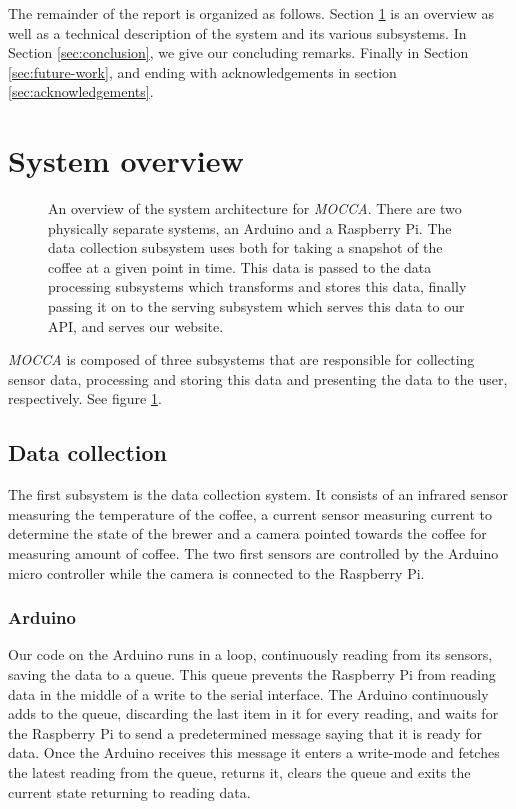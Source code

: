 \documentclass[12pt,a4paper,oneside,article]{memoir}
\numberwithin{equation}{chapter}
\begin{document}
The remainder of the report is organized as follows. Section
\ref{sec:system-overview} is an overview as well as a technical description of
the system and its various subsystems. In Section \ref{sec:conclusion}, we give
our concluding remarks. Finally in Section \ref{sec:future-work}, and ending
with acknowledgements in section \ref{sec:acknowledgements}.

\section{System overview}\label{sec:system-overview}
\begin{figure}[h]
  \centerfloat{}
  \scalebox{.75}{}
  \caption{An overview of the system architecture for \textit{MOCCA}. There are
    two physically separate systems, an Arduino and a Raspberry Pi. The data
    collection subsystem uses both for taking a snapshot of the coffee at a
    given point in time. This data is passed to the data processing subsystems
    which transforms and stores this data, finally passing it on to the serving
    subsystem which serves this data to our API, and serves our website.
  }\label{fig:architecture}
\end{figure}
\textit{MOCCA} is composed of three subsystems that are responsible for
collecting sensor data, processing and storing this data and presenting the data
to the user, respectively. See figure \ref{fig:architecture}.

\subsection{Data collection}\label{sec:data-collection}
The first subsystem is the data collection system. It consists of an 
infrared sensor measuring the temperature of the coffee, a current sensor 
measuring current to determine the state of the brewer and a camera pointed 
towards the coffee for measuring amount of coffee. The two first sensors are 
controlled by the Arduino micro controller while the camera is connected to the 
Raspberry Pi.

\subsubsection{Arduino}\label{sec:arduino}
Our code on the Arduino runs in a loop, continuously reading from its sensors,
saving the data to a queue. This queue prevents the Raspberry Pi from reading
data in the middle of a write to the serial interface. The Arduino continuously
adds to the queue, discarding the last item in it for every reading, and waits
for the Raspberry Pi to send a predetermined message saying that it is ready for
data. Once the Arduino receives this message it enters a write-mode and fetches
the latest reading from the queue, returns it, clears the queue and exits the
current state returning to reading data.
\end{document}
